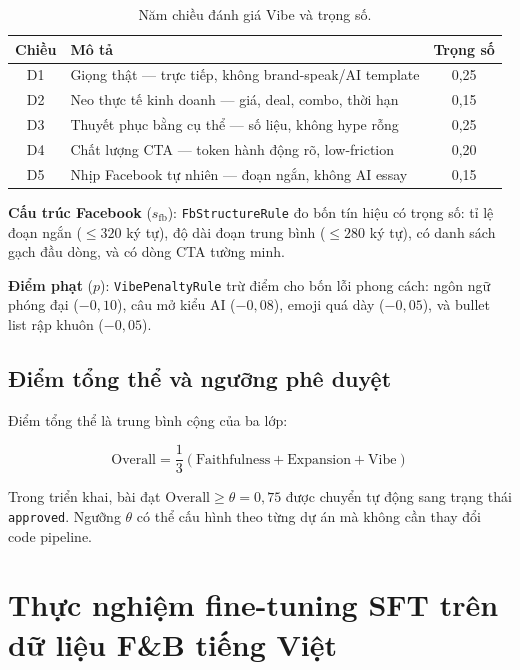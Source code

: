 \begin{table}[h]
  \centering
  \small
  \caption{Năm chiều đánh giá Vibe và trọng số.}
  \label{tab:vibe-dims}
  \begin{tabular}{cp{}c}
    \toprule
    \textbf{Chiều} & \textbf{Mô tả} & \textbf{Trọng số} \\
    \midrule
    D1 & Giọng thật --- trực tiếp, không brand-speak/AI template & 0,25 \\
    D2 & Neo thực tế kinh doanh --- giá, deal, combo, thời hạn & 0,15 \\
    D3 & Thuyết phục bằng cụ thể --- số liệu, không hype rỗng & 0,25 \\
    D4 & Chất lượng CTA --- token hành động rõ, low-friction & 0,20 \\
    D5 & Nhịp Facebook tự nhiên --- đoạn ngắn, không AI essay & 0,15 \\
    \bottomrule
  \end{tabular}
\end{table}

\textbf{Cấu trúc Facebook} ($s_{\text{fb}}$):
\texttt{FbStructureRule} đo bốn tín hiệu có trọng số: tỉ lệ đoạn
ngắn ($\leq 320$ ký tự), độ dài đoạn trung bình ($\leq 280$ ký tự),
có danh sách gạch đầu dòng, và có dòng CTA tường minh.

\textbf{Điểm phạt} ($p$): \texttt{VibePenaltyRule} trừ điểm cho bốn
lỗi phong cách: ngôn ngữ phóng đại ($-0{,}10$), câu mở kiểu AI
($-0{,}08$), emoji quá dày ($-0{,}05$), và bullet list rập khuôn
($-0{,}05$).

\subsection{Điểm tổng thể và ngưỡng phê duyệt}

Điểm tổng thể là trung bình cộng của ba lớp:

\begin{equation}
  \text{Overall} = \frac{1}{3}(\text{Faithfulness} + \text{Expansion} + \text{Vibe})
  \label{eq:overall}
\end{equation}

Trong triển khai, bài đạt $\text{Overall} \geq \theta = 0{,}75$ được
chuyển tự động sang trạng thái \texttt{approved}. Ngưỡng $\theta$ có
thể cấu hình theo từng dự án mà không cần thay đổi code pipeline.

\section{Thực nghiệm fine-tuning SFT trên dữ liệu F\&B tiếng Việt}
\label{sec:fine-tuning-result}

